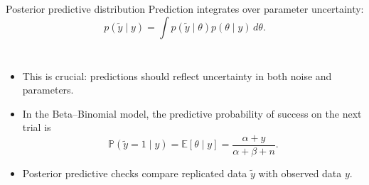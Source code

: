 \documentclass[aspectratio=169]{beamer}
\newcommand{\E}{\mathbb{E}}
\newcommand{\Prb}{\mathbb{P}}
\begin{document}
\begin{frame}{Posterior predictive distribution}
Prediction integrates over parameter uncertainty:
\[
  p(\tilde y\mid y)=\int p(\tilde y\mid\theta)p(\theta\mid y)\,d\theta.
\]

\begin{columns}[T,onlytextwidth]
\begin{itemize}
  \item This is crucial: predictions should reflect uncertainty in both noise and parameters.
  \item In the Beta--Binomial model, the predictive probability of success on the next trial is
  \[
    \Prb(\tilde y=1\mid y)=\E[\theta\mid y]=\frac{\alpha+y}{\alpha+\beta+n}.
  \]
  \item Posterior predictive checks compare replicated data $\tilde y$ with observed data $y$.
\end{itemize}

\centering
{}
\end{columns}
\end{frame}
\end{document}
